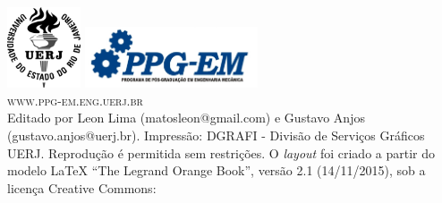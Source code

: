 \documentclass[11pt,a4paper]{book} %
\begin{document}
\vspace*{\fill}

\endgroup


\newpage
~\vfill
\thispagestyle{empty}

\noindent
\includegraphics[height=24mm]{Pictures/logo_uerj_PB.png}
\hspace{2cm}
\includegraphics[height=18mm]{Pictures/logo_ppg-em.jpg}\\



\noindent \textsc{www.ppg-em.eng.uerj.br}\\ %

\noindent Editado por Leon Lima (matosleon@gmail.com) e Gustavo Anjos
(gustavo.anjos@uerj.br). Impressão: DGRAFI - Divisão de Serviços
Gráficos UERJ. Reprodução é permitida sem restrições. O {\it layout} foi
criado a partir do modelo {\LaTeX} ``The Legrand Orange Book'', versão
2.1 (14/11/2015), sob a licença Creative Commons:
\end{document}
